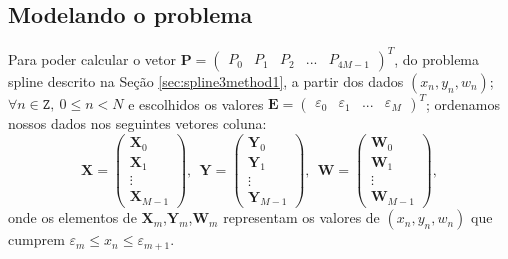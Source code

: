\documentclass[a4paper,10pt]{article}
\begin{document}
\subsection{Modelando o problema}
\label{subsec:all}
Para poder calcular o vetor $\mathbf{P}=\left(\begin{matrix}P_0 & P_1 & P_2 & ...  & P_{4M-1}\end{matrix}\right)^T$, 
do problema spline descrito  na Seção \ref{sec:spline3method1}, a partir dos dados $(x_n,y_n,w_n)$; 
$\forall n \in \mathtt{Z},~0\leq n < N$ e escolhidos os valores $\mathbf{E}=\left(\begin{matrix}\varepsilon_0 & \varepsilon_1 & ...  & \varepsilon_{M}\end{matrix}\right)^T$;
ordenamos nossos dados nos seguintes vetores coluna:
\begin{equation}
\mathbf{X}=\left(\begin{matrix}\mathbf{X}_0 \\ \mathbf{X}_1 \\ \vdots  \\ \mathbf{X}_{M-1}\end{matrix}\right),~~
\mathbf{Y}=\left(\begin{matrix}\mathbf{Y}_0 \\ \mathbf{Y}_1 \\ \vdots  \\ \mathbf{Y}_{M-1}\end{matrix}\right),~~
\mathbf{W}=\left(\begin{matrix}\mathbf{W}_0 \\ \mathbf{W}_1 \\ \vdots  \\ \mathbf{W}_{M-1}\end{matrix}\right),
\end{equation}
onde os elementos de $\mathbf{X}_m$,$\mathbf{Y}_m$,$\mathbf{W}_m$ representam os valores de $(x_n,y_n,w_n)$
que cumprem $\varepsilon_m \leq x_n \leq \varepsilon_{m+1}$.
\end{document}
